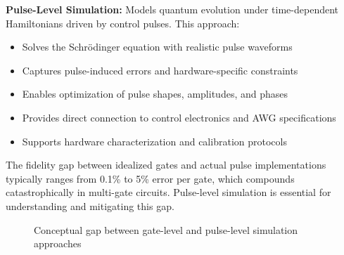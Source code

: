 \documentclass[12pt,a4paper]{article}
\begin{document}
\textbf{Pulse-Level Simulation:} Models quantum evolution under time-dependent Hamiltonians driven by control pulses. This approach:

\begin{itemize}[noitemsep]
\item Solves the Schrödinger equation with realistic pulse waveforms
\item Captures pulse-induced errors and hardware-specific constraints
\item Enables optimization of pulse shapes, amplitudes, and phases
\item Provides direct connection to control electronics and AWG specifications
\item Supports hardware characterization and calibration protocols
\end{itemize}

The fidelity gap between idealized gates and actual pulse implementations typically ranges from 0.1\% to 5\% error per gate, which compounds catastrophically in multi-gate circuits. Pulse-level simulation is essential for understanding and mitigating this gap.

\begin{figure}[h]
\centering
{}
\caption{Conceptual gap between gate-level and pulse-level simulation approaches}
\label{fig:gate_pulse_gap}
\end{figure}
\end{document}
